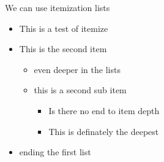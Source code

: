 We can use itemization lists
\begin{itemize}
	\item This is a test of itemize
	\item This is the second item
	\begin{itemize}
		\item even deeper in the lists
		\item this is a second sub item
		\begin{itemize}
			\item Is there no end to item depth
			\item This is definately the deepest
		\end{itemize}
	\end{itemize}
	\item ending the first list
\end{itemize}
